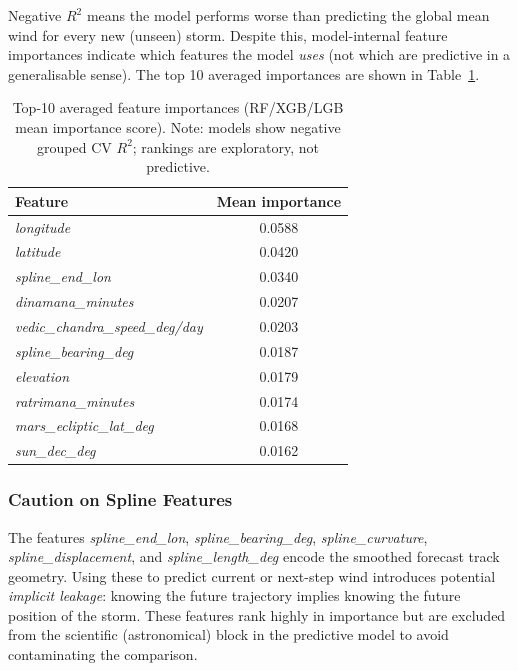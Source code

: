 \documentclass[12pt,a4paper]{article}
\begin{document}
Negative $R^2$ means the model performs worse than predicting the global mean wind for
every new (unseen) storm.
Despite this, model-internal feature importances indicate which features the model
\emph{uses} (not which are predictive in a generalisable sense).
The top 10 averaged importances are shown in Table~\ref{tab:importance}.

\begin{table}[h]
\centering
\caption{Top-10 averaged feature importances (RF/XGB/LGB mean importance score).
  Note: models show negative grouped CV $R^2$; rankings are exploratory, not predictive.}
\label{tab:importance}
\begin{tabular}{lc}
\toprule
\textbf{Feature} & \textbf{Mean importance} \\
\midrule
\textit{longitude}                        & 0.0588 \\
\textit{latitude}                         & 0.0420 \\
\textit{spline\_end\_lon}                 & 0.0340 \\
\textit{dinamana\_minutes}                & 0.0207 \\
\textit{vedic\_chandra\_speed\_deg/day}   & 0.0203 \\
\textit{spline\_bearing\_deg}             & 0.0187 \\
\textit{elevation}                        & 0.0179 \\
\textit{ratrimana\_minutes}               & 0.0174 \\
\textit{mars\_ecliptic\_lat\_deg}         & 0.0168 \\
\textit{sun\_dec\_deg}                    & 0.0162 \\
\bottomrule
\end{tabular}
\end{table}

\subsubsection{Caution on Spline Features}

The features \textit{spline\_end\_lon}, \textit{spline\_bearing\_deg},
\textit{spline\_curvature}, \textit{spline\_displacement}, and
\textit{spline\_length\_deg} encode the smoothed forecast track geometry.
Using these to predict current or next-step wind introduces potential
\emph{implicit leakage}: knowing the future trajectory implies knowing the
future position of the storm. These features rank highly in importance but
are excluded from the scientific (astronomical) block in the predictive model
to avoid contaminating the comparison.
\end{document}
